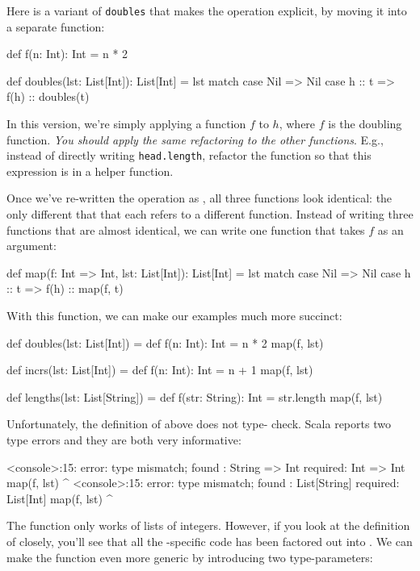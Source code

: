 \documentclass{book}
\begin{document}
Here is a variant of \verb|doubles| that makes the operation explicit, by
moving it into a separate function:
%
\begin{scalacode}
def f(n: Int): Int = n * 2

def doubles(lst: List[Int]): List[Int] = lst match {
  case Nil => Nil
  case h :: t => f(h) :: doubles(t)
}
\end{scalacode}

In this version, we're simply applying a function $f$ to $h$, where $f$
is the doubling function. \emph{You should apply the same refactoring to the other
functions}. E.g.,  instead of directly writing \verb|head.length|, refactor
the function so that this expression is in a helper function.

Once we've re-written the operation as , all three
functions look identical: the only different that that each refers to a
different function.
Instead of writing three functions that are almost identical, we can
write one function that takes $f$ as an argument:

\begin{scalacode}
def map(f: Int => Int, lst: List[Int]): List[Int] = lst match {
  case Nil => Nil
  case h :: t => f(h) :: map(f, t)
}
\end{scalacode}

With this function, we can make our examples much more succinct:

\begin{scalacode}
def doubles(lst: List[Int]) = {
  def f(n: Int): Int = n * 2
  map(f, lst)
}

def incrs(lst: List[Int]) = {
  def f(n: Int): Int = n + 1
  map(f, lst)
}

def lengths(lst: List[String]) = {
  def f(str: String): Int = str.length
  map(f, lst)
}
\end{scalacode}

Unfortunately, the definition of  above does not type-
check. Scala reports two type errors and they are both very informative:

\begin{console}
<console>:15: error: type mismatch;
 found   : String => Int
 required: Int => Int
         map(f, lst)
             ^
<console>:15: error: type mismatch;
 found   : List[String]
 required: List[Int]
         map(f, lst)
                  ^
\end{console}

The  function only works of lists of integers. However, if you
look at the definition of  closely, you'll see that all the
-specific code has been factored out into . We
can make the function even more generic by introducing two type-parameters:
\end{document}
